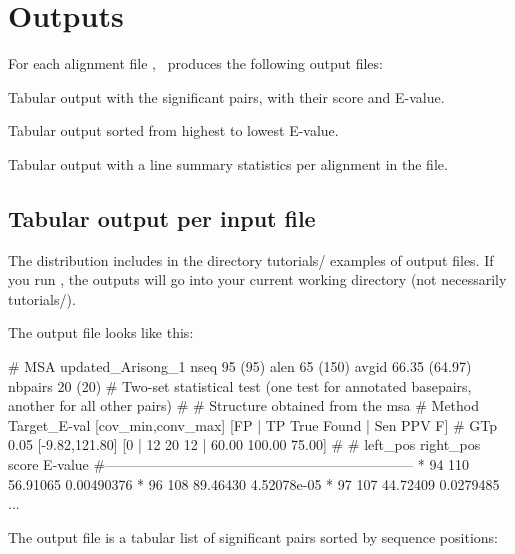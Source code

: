 \label{section:outputs}
\setcounter{footnote}{0}
\section{Outputs}

For each alignment file , \rscape\, produces the
following output files:

\begin{sreitems}{}
\item[\emprog{rnafile.out}] Tabular output with the significant pairs,
  with their score and E-value.
%
\item[\emprog{rnafile.sorted.out}] Tabular output sorted from highest to
  lowest E-value.
%
%
\item[\emprog{rnafile.sum}] Tabular output with a line summary statistics
  per alignment in the file.
%
\end{sreitems}

\subsection{Tabular output per input file}

The distribution includes in the directory tutorials/ examples of
output files. If you run \rscape, the outputs will go into your
current working directory (not necessarily tutorials/).

The output file  looks like this:

\begin{sreoutput}
# MSA updated_Arisong_1 nseq 95 (95) alen 65 (150) avgid 66.35 (64.97) nbpairs 20 (20)
# Two-set statistical test (one test for annotated basepairs, another for all other pairs)
#
# Structure obtained from the msa
# Method Target_E-val [cov_min,conv_max] [FP | TP True Found | Sen PPV F] 
# GTp    0.05           [-9.82,121.80]    [0 | 12 20 12 | 60.00 100.00 75.00] 
#
#       left_pos       right_pos        score           E-value
#------------------------------------------------------------------
*               94             110      56.91065        0.00490376
*               96             108      89.46430        4.52078e-05
*               97             107      44.72409        0.0279485
...
\end{sreoutput}
The output file is a tabular list of significant pairs sorted by sequence positions:

